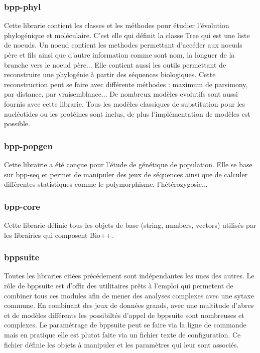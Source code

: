 	\subsubsection*{bpp-phyl}
	Cette librarie contient les classes et les méthodes pour étudier l'évolution phylogénique et moléculaire. C'est elle qui définit la classe Tree qui est une liste de noeuds. Un noeud contient les methodes permettant d'accéder aux noeuds père et fils ainsi que d'autre information comme sont nom, la longuer de la branche vers le noeud père...
	Elle contient aussi les outils permettant de reconstruire une phylogénie à partir des séquences biologiques. Cette reconstruction peut se faire avec différente méthodes : maximum de parsimony, par distance, par vraisemblance...
	De nombreux modèles evolutifs sont aussi fournis avec cette librarie. Tous les modèles classiques de substitution pour les nucléotides ou les protéines sont inclus, de plus l'implémentation de modèles est possible.
	\subsubsection*{bpp-popgen}
	Cette librairie a été conçue pour l'étude de génétique de population. Elle se base sur bpp-seq et permet de manipuler des jeux de séquences ainsi que de calculer différentes statistiques comme le polymorphisme, l'hétérozygosie...
	
	\subsubsection*{bpp-core}
	Cette librarie définie tous les objets de base (string, numbers, vectors) utilisés par les librairies qui composent Bio++.
	
	\subsubsection*{bppsuite}
	Toutes les libraries citées précédement sont indépendantes les unes des autres. Le rôle de bppsuite est d'offir des utilitaires prêts à l'emploi qui permetent de combiner tous ces modules afin de mener des analyses complexes avec une sytaxe commune. En combinant des jeux de données grands, avec une multitude d'abres et de modèles différents les possibiltés d'appel de bppsuite sont nombreuses et complexes. Le paramétrage de bppsuite peut se faire via la ligne de commande mais en pratique elle est plutot faite via un fichier texte de configuration. Ce fichier définie les objets à manipuler et les paramètres qui leur sont associés.
	
